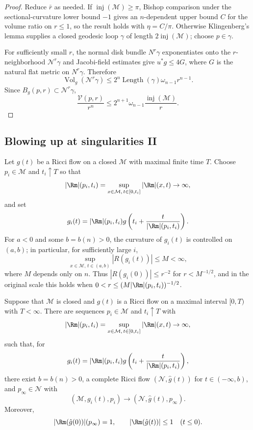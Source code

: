 \begin{proof}
\sketch Reduce $\bar r$ as needed. If $\operatorname{inj}(\mathcal M)\geq\pi$,
Bishop comparison under the sectional-curvature lower bound $-1$ gives an
$n$-dependent upper bound $C$ for the volume ratio on $r\leq1$, so the result
holds with $\eta=C/\pi$. Otherwise Klingenberg's lemma supplies a closed
geodesic loop $\gamma$ of length $2\operatorname{inj}(\mathcal M)$; choose
$p\in\gamma$.

For sufficiently small $r$, the normal disk bundle $N^r\gamma$ exponentiates
onto the $r$-neighborhood $\mathcal N^r\gamma$ and Jacobi-field estimates give
$u^*g\leq4G$, where $G$ is the natural flat metric on $N^r\gamma$. Therefore
\[
\operatorname{Vol}_g(\mathcal N^r\gamma)
\leq2^n\operatorname{Length}(\gamma)\omega_{n-1}r^{n-1}.
\]
Since $B_g(p,r)\subset\mathcal N^r\gamma$,
\[
\frac{\mathcal V(p,r)}{r^n}
\leq2^{n+1}\omega_{n-1}\frac{\operatorname{inj}(\mathcal M)}r.
\]
\end{proof}

\subsection{Blowing up at singularities II}

Let $g(t)$ be a Ricci flow on a closed $\mathcal M$ with maximal finite time
$T$. Choose $p_i\in\mathcal M$ and $t_i\uparrow T$ so that
\[
|\Rm|(p_i,t_i)=\sup_{x\in\mathcal M,\,t\in[0,t_i]}|\Rm|(x,t)\to\infty,
\]
and set
\[
g_i(t)=|\Rm|(p_i,t_i)
g\left(t_i+\frac{t}{|\Rm|(p_i,t_i)}\right).
\]
For $a<0$ and some $b=b(n)>0$, the curvature of $g_i(t)$ is controlled on
$(a,b)$; in particular, for sufficiently large $i$,
\[
\sup_{x\in\mathcal M,\,t\in(a,b)}|R(g_i(t))|\leq M<\infty,
\]
where $M$ depends only on $n$. Thus $|R(g_i(0))|\leq r^{-2}$ for
$r<M^{-1/2}$, and in the original scale this holds when
$0<r\leq(M|\Rm|(p_i,t_i))^{-1/2}$.

\begin{theorem}
\label{topping-ch8-blow-up-singularities}

Suppose that $\mathcal M$ is closed and $g(t)$ is a Ricci flow on a maximal
interval $[0,T)$ with $T<\infty$. There are sequences $p_i\in\mathcal M$ and
$t_i\uparrow T$ with
\[
|\Rm|(p_i,t_i)=\sup_{x\in\mathcal M,\,t\in[0,t_i]}|\Rm|(x,t)\to\infty,
\]
such that, for
\[
g_i(t)=|\Rm|(p_i,t_i)
g\left(t_i+\frac{t}{|\Rm|(p_i,t_i)}\right),
\]
there exist $b=b(n)>0$, a complete Ricci flow $(\mathcal N,\hat g(t))$ for
$t\in(-\infty,b)$, and $p_\infty\in\mathcal N$ with
\[
(\mathcal M,g_i(t),p_i)\longrightarrow(\mathcal N,\hat g(t),p_\infty).
\]
Moreover,
\[
|\Rm(\hat g(0))|(p_\infty)=1,
\qquad |\Rm(\hat g(t))|\leq1\quad(t\leq0).
\]
\end{theorem}

